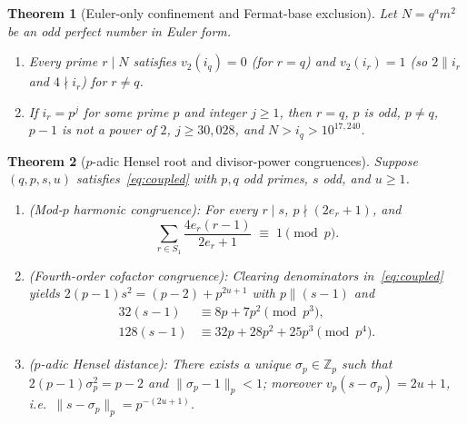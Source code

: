 \documentclass[11pt]{amsart}
\newtheorem{theorem}{Theorem}
\theoremstyle{definition}
\theoremstyle{remark}
\begin{document}
\begin{theorem}[Euler-only confinement and Fermat-base exclusion]\label{thm:euler-only}
Let $N = q^a m^2$ be an odd perfect number in Euler form.
\begin{enumerate}
  \item Every prime $r \mid N$ satisfies $v_2(i_q) = 0$ (for $r = q$) and $v_2(i_r) = 1$ (so $2 \parallel i_r$ and $4 \nmid i_r$) for $r \ne q$.
  \item If $i_r = p^j$ for some prime $p$ and integer $j \ge 1$, then $r = q$, $p$ is odd, $p \ne q$, $p - 1$ is not a power of $2$, $j \ge 30{,}028$, and $N > i_q > 10^{17{,}240}$.
\end{enumerate}
\end{theorem}

\begin{theorem}[$p$-adic Hensel root and divisor-power congruences]\label{thm:padic}
Suppose $(q, p, s, u)$ satisfies~\eqref{eq:coupled} with $p, q$ odd primes, $s$ odd, and $u \ge 1$.
\begin{enumerate}
  \item \emph{(Mod-$p$ harmonic congruence):} For every $r \mid s$, $p \nmid (2 e_r + 1)$, and
  \begin{equation}\label{eq:harmonic-mod-p}
    \sum_{r \in S_1} \frac{4 e_r (r - 1)}{2 e_r + 1} \;\equiv\; 1 \pmod p.
  \end{equation}
  \item \emph{(Fourth-order cofactor congruence):} Clearing denominators in~\eqref{eq:coupled} yields $2(p - 1) s^2 = (p - 2) + p^{2u + 1}$ with $p \parallel (s - 1)$ and
  \begin{align}
    32(s - 1) &\equiv 8p + 7p^2 \pmod{p^3}, \label{eq:mod-p3}\\
    128(s - 1) &\equiv 32p + 28p^2 + 25p^3 \pmod{p^4}. \label{eq:mod-p4}
  \end{align}
  \item \emph{($p$-adic Hensel distance):} There exists a unique $\sigma_p \in \mathbb{Z}_p$ such that $2(p - 1)\sigma_p^2 = p - 2$ and $\|\sigma_p - 1\|_p < 1$; moreover $v_p(s - \sigma_p) = 2u + 1$, i.e.\ $\|s - \sigma_p\|_p = p^{-(2u + 1)}$.
\end{enumerate}
\end{theorem}
\end{document}
